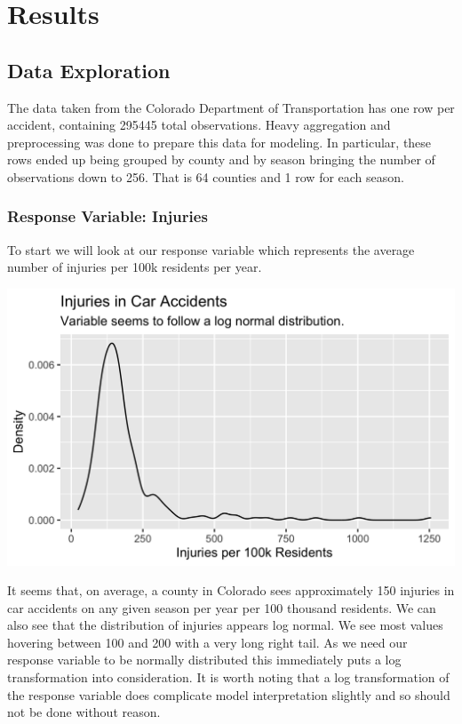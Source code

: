 \section*{Results}

\subsection*{Data Exploration}

The data taken from the Colorado Department of Transportation has one row per accident, containing 295445 total observations. Heavy aggregation and preprocessing was done to prepare this data for modeling. In particular, these rows ended up being grouped by county and by season bringing the number of observations down to 256. That is 64 counties and 1 row for each season. 



\subsubsection*{Response Variable: Injuries}

To start we will look at our response variable which represents the average number of injuries per 100k residents per year. \vspace{0.5cm}

\begin{center}
    \includegraphics[width=0.8\columnwidth]{../presentation/presentation_images/injury_dist.png}
\end{center}

It seems that, on average, a county in Colorado sees approximately 150 injuries in car accidents on any given season per year per 100 thousand residents. We can also see that the distribution of injuries appears log normal. We see most values hovering between 100 and 200 with a very long right tail. As we need our response variable to be normally distributed this immediately puts a log transformation into consideration. It is worth noting that a log transformation of the response variable does complicate model interpretation slightly and so should not be done without reason.


